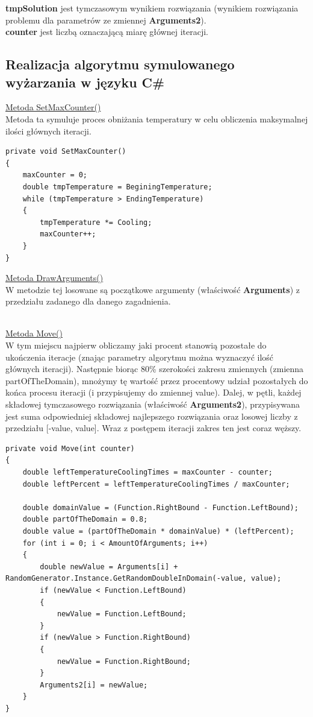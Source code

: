 \documentclass[twoside]{projektInzynierskiMS1}
\newcommand{\si}{ś}
\begin{document}
\textbf{tmpSolution} jest tymczasowym wynikiem rozwiązania (wynikiem rozwiązania problemu dla parametrów ze zmiennej \textbf{Arguments2}). \\

\textbf{counter} jest liczbą oznaczającą miarę głównej iteracji. \\

\subsection{Realizacja algorytmu symulowanego wyżarzania w języku C\#}

\underline{Metoda SetMaxCounter()} \\
Metoda ta symuluje proces obniżania temperatury w celu obliczenia maksymalnej ilo\si ci głównych iteracji. \\
\begin{verbatim}
private void SetMaxCounter()
{
    maxCounter = 0;
    double tmpTemperature = BeginingTemperature;
    while (tmpTemperature > EndingTemperature)
    {
        tmpTemperature *= Cooling;
        maxCounter++;
    }
}
\end{verbatim}

\underline{Metoda DrawArguments()} \\
W metodzie tej losowane są początkowe argumenty (wła\si ciwo\si ć \textbf{Arguments}) z przedziału zadanego dla danego zagadnienia. \\\

\underline{Metoda Move()} \\
W tym miejscu najpierw obliczamy jaki procent stanowią pozostałe do ukończenia iteracje (znając parametry algorytmu można wyznaczyć ilo\si ć głównych iteracji). Następnie biorąc 80\% szeroko\si ci zakresu zmiennych (zmienna partOfTheDomain), mnożymy tę warto\si ć przez procentowy udział pozostałych do końca procesu iteracji (i przypisujemy do zmiennej value). Dalej, w pętli, każdej składowej tymczasowego rozwiązania (wła\si ciwo\si ć \textbf{Arguments2}), przypisywana jest suma odpowiedniej składowej najlepszego rozwiązania oraz losowej liczby z przedziału [-value, value]. Wraz z postępem iteracji zakres ten jest coraz węższy. \\
\newpage
\begin{verbatim}
private void Move(int counter)
{
    double leftTemperatureCoolingTimes = maxCounter - counter;
    double leftPercent = leftTemperatureCoolingTimes / maxCounter;

    double domainValue = (Function.RightBound - Function.LeftBound);
    double partOfTheDomain = 0.8;
    double value = (partOfTheDomain * domainValue) * (leftPercent);
    for (int i = 0; i < AmountOfArguments; i++)
    {
        double newValue = Arguments[i] + 
RandomGenerator.Instance.GetRandomDoubleInDomain(-value, value);
        if (newValue < Function.LeftBound)
        {
            newValue = Function.LeftBound;
        }
        if (newValue > Function.RightBound)
        {
            newValue = Function.RightBound;
        }
        Arguments2[i] = newValue;
    }
}
\end{verbatim}
\end{document}
